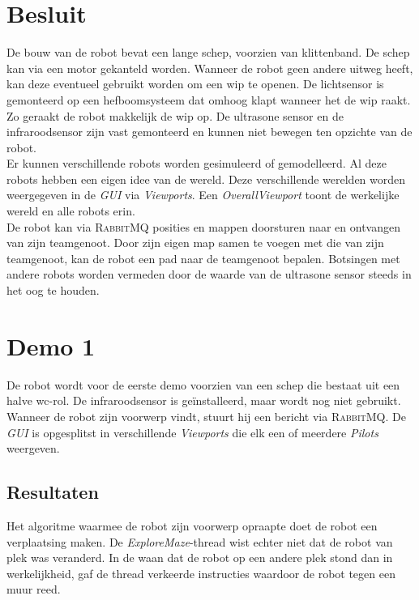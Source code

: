 \documentclass[eind]{penoverslag}
\begin{document}
\section{Besluit}
\label{sec:Besluit}
De bouw van de robot bevat een lange schep, voorzien van klittenband. De schep kan via een motor gekanteld worden. Wanneer de robot geen andere uitweg heeft, kan deze eventueel gebruikt worden om een wip te openen. De lichtsensor is gemonteerd op een hefboomsysteem dat omhoog klapt wanneer het de wip raakt. Zo geraakt de robot makkelijk de wip op. De ultrasone sensor en de infraroodsensor zijn vast gemonteerd en kunnen niet bewegen ten opzichte van de robot.\\

Er kunnen verschillende robots worden gesimuleerd of gemodelleerd. Al deze robots hebben een eigen idee van de wereld. Deze verschillende werelden worden weergegeven in de \textit{GUI} via \textit{Viewports}. Een \textit{OverallViewport} toont de werkelijke wereld en alle robots erin.\\

De robot kan via \textsc{RabbitMQ} posities en mappen doorsturen naar en ontvangen van zijn teamgenoot. Door zijn eigen map samen te voegen met die van zijn teamgenoot, kan de robot een pad naar de teamgenoot bepalen. Botsingen met andere robots worden vermeden door de waarde van de ultrasone sensor steeds in het oog te houden.


\newpage
\makeappendix

\section{Demo 1}
\label{Asec:demo1}
De robot wordt voor de eerste demo voorzien van een schep die bestaat uit een halve wc-rol. De infraroodsensor is ge\"installeerd, maar wordt nog niet gebruikt. Wanneer de robot zijn voorwerp vindt, stuurt hij een bericht via \textsc{RabbitMQ}. De \textit{GUI} is opgesplitst in verschillende \textit{Viewports} die elk een of meerdere \textit{Pilots} weergeven.

\subsection{Resultaten}
\label{Assec:result1}
Het algoritme waarmee de robot zijn voorwerp opraapte doet de robot een verplaatsing maken. De \textit{ExploreMaze}-thread wist echter niet dat de robot van plek was veranderd. In de waan dat de robot op een andere plek stond dan in werkelijkheid, gaf de thread verkeerde instructies waardoor de robot tegen een muur reed.
\end{document}
